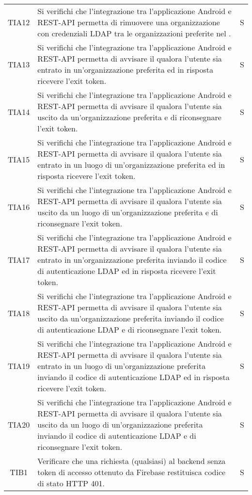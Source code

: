{\begin{longtable}{ c C{13cm} C{1cm}}
TIA12 & Si verifichi che l’integrazione tra l’applicazione Android e REST-API permetta di rimuovere una organizzazione con credenziali LDAP tra le organizzazioni preferite nel . & S \\
TIA13 & Si verifichi che l’integrazione tra l’applicazione Android e REST-API permetta di avvisare il  qualora l'utente sia entrato in un'organizzazione preferita ed in risposta ricevere l'exit token. & S \\
TIA14 & Si verifichi che l’integrazione tra l’applicazione Android e REST-API permetta di avvisare il  qualora l'utente sia uscito da un'organizzazione preferita e di riconsegnare l'exit token. & S \\
TIA15 & Si verifichi che l’integrazione tra l’applicazione Android e REST-API permetta di avvisare il  qualora l'utente sia entrato in un luogo di un'organizzazione preferita ed in risposta ricevere l'exit token. & S \\
TIA16 & Si verifichi che l’integrazione tra l’applicazione Android e REST-API permetta di avvisare il  qualora l'utente sia uscito da un luogo di un'organizzazione preferita e di riconsegnare l'exit token. & S \\
TIA17 & Si verifichi che l’integrazione tra l’applicazione Android e REST-API permetta di avvisare il  qualora l'utente sia entrato in un'organizzazione preferita inviando il codice di autenticazione LDAP ed in risposta ricevere l'exit token. & S \\
TIA18 & Si verifichi che l’integrazione tra l’applicazione Android e REST-API permetta di avvisare il  qualora l'utente sia uscito da un'organizzazione preferita inviando il codice di autenticazione LDAP e di riconsegnare l'exit token. & S \\
TIA19 & Si verifichi che l’integrazione tra l’applicazione Android e REST-API permetta di avvisare il  qualora l'utente sia entrato in un luogo di un'organizzazione preferita inviando il codice di autenticazione LDAP ed in risposta ricevere l'exit token. & S \\
TIA20 & Si verifichi che l’integrazione tra l’applicazione Android e REST-API permetta di avvisare il  qualora l'utente sia uscito da un luogo di un'organizzazione preferita inviando il codice di autenticazione LDAP e di riconsegnare l'exit token. & S \\
TIB1 & Verificare che una richiesta (qualsiasi) al backend senza token di accesso ottenuto da Firebase restituisca codice di stato HTTP 401. & S \\

\end{longtable}}
